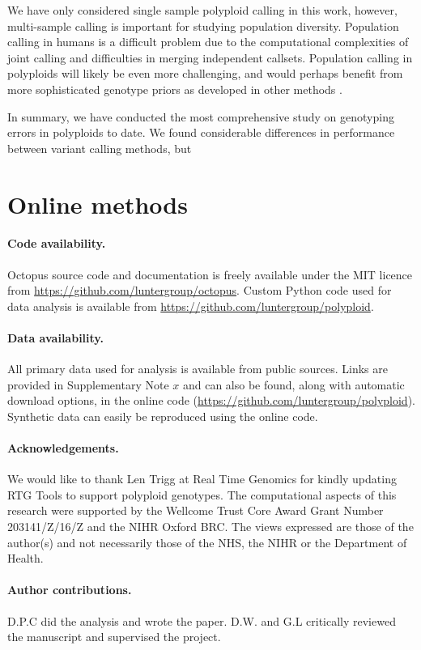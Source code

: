 \documentclass[notitlepage, twocolumn, 10pt]{article}
\begin{document}
We have only considered single sample polyploid calling in this work, however, multi-sample calling is  important for studying population diversity. Population calling in humans is a difficult problem due to the computational complexities of joint calling and difficulties in merging independent callsets. Population calling in polyploids will likely be even more challenging, and would perhaps benefit from  more sophisticated genotype priors as developed in other methods \cite{RN666}.

In summary, we have conducted the most comprehensive study on genotyping errors in polyploids to date. We found considerable differences in performance between variant calling methods, but 




\section*{Online methods}\small

\paragraph*{Code availability.} Octopus source code and documentation is freely available under the MIT licence from \url{https://github.com/luntergroup/octopus}. Custom Python code used for data analysis is available from \url{https://github.com/luntergroup/polyploid}.

\paragraph*{Data availability.} All primary data used for analysis is available from public sources. Links are provided in Supplementary Note $x$ and can also be found, along with automatic download options, in the online code (\url{https://github.com/luntergroup/polyploid}). Synthetic data can easily be reproduced using the online code.

\paragraph*{Acknowledgements.} We would like to thank Len Trigg at Real Time Genomics for kindly updating RTG Tools to support polyploid genotypes. The computational aspects of this research were supported by the Wellcome Trust Core Award Grant Number 203141/Z/16/Z and the NIHR Oxford BRC. The views expressed are those of the author(s) and not necessarily those of the NHS, the NIHR or the Department of Health.

\paragraph*{Author contributions.} D.P.C did the analysis and wrote the paper. D.W. and G.L critically reviewed the manuscript and supervised the project.
\end{document}

